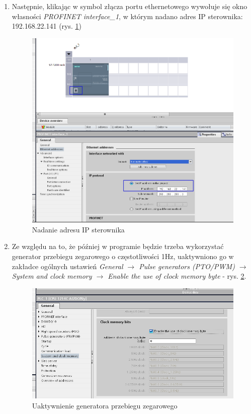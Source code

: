 \documentclass[12pt]{article}
\begin{document}
\begin{enumerate}
    \item Następnie, klikając w symbol złącza portu ethernetowego wywołuje się okno własności \textit{PROFINET interface\_1}, w którym nadano adres IP sterownika: 192.168.22.141 (rys. \ref{ip})
    \begin{figure}[H]
        \centering
        \includegraphics[scale=0.45]{./zdj/ip.png}
        \caption{Nadanie adresu IP sterownika}
        \label{ip}
    \end{figure}

    \item Ze względu na to, że później w programie będzie trzeba wykorzystać generator przebiegu zegarowego o częstotliwości 1Hz, uaktywniono go w zakładce ogólnych ustawień \textit{General $\rightarrow$ Pulse generators (PTO/PWM) $\rightarrow$ System and clock memory $\rightarrow$ Enable the use of clock memory byte} - rys. \ref{clock}.
    \begin{figure}[H]
        \centering
        \includegraphics[scale=0.55]{./zdj/clock_bits.png}
        \caption{Uaktywnienie generatora przebiegu zegarowego}
        \label{clock}
    \end{figure} 


\end{enumerate}
\end{document}
